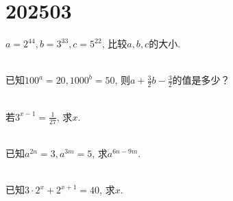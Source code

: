 \section{202503}

\item{
    $a=2^{44}, b=3^{33}, c=5^{22}$, 比较$a, b, c$的大小.
} 
\\ \\
\item{
    已知$100^a=20, 1000^b=50$, 则$a+\frac{3}{2}b-\frac{3}{2}$的值是多少？
} 
\\ \\
\item{
    若$3^{x-1}=\frac{1}{27}$, 求$x$.
} 
\\ \\
\item{
    已知$a^{2n}=3, a^{3m}=5$, 求$a^{6n-9m}$.
} 
\\ \\
\item{
    已知$3\cdot2^x + 2^{x+1}=40$, 求$x$.
} 
\\ \\